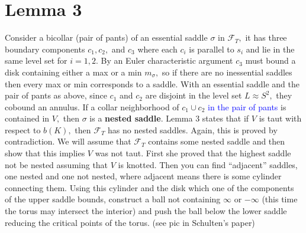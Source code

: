 \documentclass[11pt, oneside]{article}
\begin{document}
\section*{Lemma 3}
Consider a bicollar (pair of pants) of an essential saddle $\sigma$ in $\mathcal{F}_{T},$ it has three boundary components $c_{1}, c_{2},$ and $c_{3}$ where each $c_{i}$ is parallel to $s_{i}$ and lie in the same level set  for $i = 1, 2$. By an Euler characteristic argument $c_{3}$ must bound a disk containing either a max or a min $m_{\sigma},$ so if there are no inessential saddles then every max or min corresponds to a saddle. \newline \newline
With an essential saddle and the pair of pants as above, since $c_{1}$ and $c_{2}$ are disjoint in the level set $L \approx S^{2},$ they cobound an annulus. If a collar neighborhood of $c_{1} \cup c_{2}$ \textcolor{blue}{in the pair of pants} is contained in $V,$ then $\sigma$ is a \textbf{nested saddle}. 
\newline \newline Lemma 3 states that if $V$ is taut with respect to $b(K),$ then $\mathcal{F}_{T}$ has no nested saddles. Again, this is proved by contradiction. We will assume that $\mathcal{F}_{T}$ contains some nested saddle and then show that this implies $V$ was not taut. First she proved that the highest saddle not be nested assuming that $V$ is knotted. Then you can find ``adjacent'' saddles, one nested and one not nested, where adjacent means there is some cylinder connecting them. Using this cylinder and the disk which one of the components of the upper saddle bounds, construct a  ball not containing $\infty$ or $-\infty$ (this time the torus may intersect the interior) and push the ball below the lower saddle reducing the critical points of the torus. (see pic in Schulten's paper)
\end{document}
